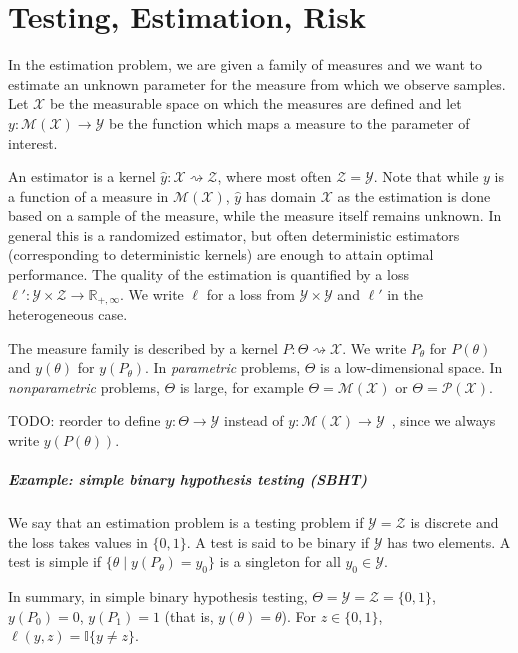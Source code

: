 \chapter{Testing, Estimation, Risk}

In the estimation problem, we are given a family of measures and we want to estimate an unknown parameter for the measure from which we observe samples.
Let $\mathcal X$ be the measurable space on which the measures are defined and let $y : \mathcal M(\mathcal X) \to \mathcal Y$ be the function which maps a measure to the parameter of interest.

An estimator is a kernel $\hat{y} : \mathcal X \rightsquigarrow \mathcal Z$, where most often $\mathcal Z = \mathcal Y$.
Note that while $y$ is a function of a measure in $\mathcal M(\mathcal X)$, $\hat{y}$ has domain $\mathcal X$ as the estimation is done based on a sample of the measure, while the measure itself remains unknown.
In general this is a randomized estimator, but often deterministic estimators (corresponding to deterministic kernels) are enough to attain optimal performance.
The quality of the estimation is quantified by a loss $\ell' : \mathcal Y \times \mathcal Z \to \mathbb{R}_{+, \infty}$. We write $\ell$ for a loss from $\mathcal Y \times \mathcal Y$ and $\ell'$ in the heterogeneous case.

The measure family is described by a kernel $P : \Theta \rightsquigarrow \mathcal X$. We write $P_\theta$ for $P(\theta)$ and $y(\theta)$ for $y(P_\theta)$.
In \emph{parametric} problems, $\Theta$ is a low-dimensional space. In \emph{nonparametric} problems, $\Theta$ is large, for example $\Theta = \mathcal M (\mathcal X)$ or $\Theta = \mathcal P(\mathcal X)$.

TODO: reorder to define $y: \Theta \to \mathcal Y$ instead of $y : \mathcal M(\mathcal X) \to \mathcal Y$~, since we always write $y(P(\theta))$.

\paragraph{Example: simple binary hypothesis testing (SBHT)}

We say that an estimation problem is a testing problem if $\mathcal Y = \mathcal Z$ is discrete and the loss takes values in $\{0, 1\}$.
A test is said to be binary if $\mathcal Y$ has two elements.
A test is simple if $\{\theta \mid y(P_\theta) = y_0\}$ is a singleton for all $y_0 \in \mathcal Y$.

In summary, in simple binary hypothesis testing, $\Theta = \mathcal Y = \mathcal Z = \{0,1\}$, $y(P_0) = 0$, $y(P_1) = 1$ (that is, $y(\theta) = \theta$). For $z \in \{0,1\}$, $\ell(y, z) = \mathbb{I}\{y \ne z\}$.

